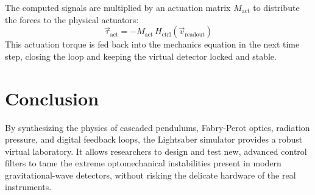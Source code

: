 \documentclass{article}
\begin{document}
The computed signals are multiplied by an actuation matrix $M_{\text{act}}$ to distribute the forces to the physical actuators:
\begin{equation}
    \vec{\tau}_{\text{act}} = - M_{\text{act}} \, H_{\text{ctrl}} (\vec{v}_{\text{readout}})
\end{equation}
This actuation torque is fed back into the mechanics equation in the next time step, closing the loop and keeping the virtual detector locked and stable.

\section{Conclusion}
By synthesizing the physics of cascaded pendulums, Fabry-Perot optics, radiation pressure, and digital feedback loops, the Lightsaber simulator provides a robust virtual laboratory. It allows researchers to design and test new, advanced control filters to tame the extreme optomechanical instabilities present in modern gravitational-wave detectors, without risking the delicate hardware of the real instruments.
\end{document}
